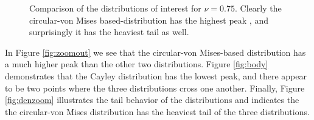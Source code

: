 
\begin{figure}[h!]
\centering
{}
\caption{Comparison of the distributions of interest for $\nu=0.75$.  Clearly the circular-von Mises based-distribution has the highest peak , and surprisingly it has the heaviest tail as well.}
\label{fig:Haar}
\end{figure}

In Figure \ref{fig:zoomout} we see that the circular-von Mises-based distribution has a much higher peak  than the other two distributions.  Figure \ref{fig:body} demonstrates that the Cayley distribution has the lowest peak, and there appear to be two points where the three distributions cross one another.  Finally, Figure \ref{fig:denzoom} illustrates the tail behavior of the distributions and indicates the the circular-von Mises distribution has the heaviest tail of the three distributions. 

